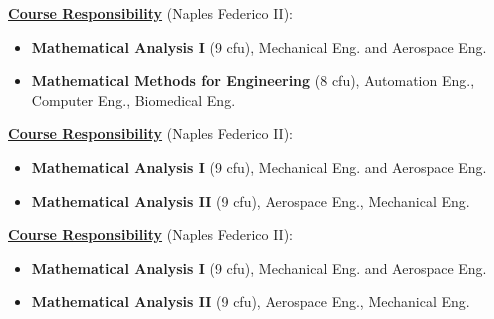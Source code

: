 \documentclass[11pt,a4paper,sans,colorlinks,linkcolor=green]{moderncv}
\begin{document}
{
\textbf{\underline{Course Responsibility}} (Naples Federico II):
  \begin{itemize} \item \textbf{Mathematical Analysis I} (9 cfu),
   Mechanical Eng. and Aerospace Eng.
  \item \textbf{Mathematical Methods for Engineering} (8 cfu), Automation Eng., Computer Eng., Biomedical Eng.
 \end{itemize}
    \vspace{-.6cm}\phantom{x}
  }

{
\textbf{\underline{Course Responsibility}} (Naples Federico II):
  \begin{itemize} \item \textbf{Mathematical Analysis I} (9 cfu),
   Mechanical Eng. and Aerospace Eng.
  \item \textbf{Mathematical Analysis II} (9 cfu),  Aerospace Eng., Mechanical Eng.
 \end{itemize}
    \vspace{-.6cm}\phantom{x}
  }
{
\textbf{\underline{Course Responsibility}} (Naples Federico II):
  \begin{itemize}\item \textbf{Mathematical Analysis I} (9 cfu),
   Mechanical Eng. and Aerospace Eng.
  \item  \textbf{Mathematical Analysis II} (9 cfu),  Aerospace Eng., Mechanical Eng.
 \end{itemize}
    \vspace{-.6cm}\phantom{x}
  }
\end{document}
